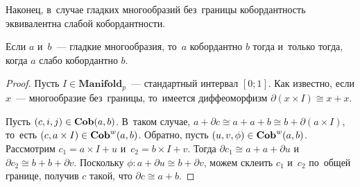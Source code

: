 \documentclass[a4paper,oneside]{article}
\begin{document}
Наконец, в~случае гладких многообразий без~границы кобордантность эквивалентна слабой кобордантности.

\begin{statement*}
    Если $a$ и~$b$~— гладкие многообразия, то~$a$ кобордантно $b$ тогда и~только тогда,
    когда $a$ слабо кобордантно $b$.
\end{statement*}

\begin{proof}
    Пусть $I \in \mathbf{Manifold}_p$~— стандартный интервал $[0; 1]$.
    Как известно, если $x$~— многообразие без~границы,
    то~имеется диффеоморфизм $\partial(x \times I) \cong x + x$.

    Пусть $(c, i, j) \in \mathbf{Cob}(a, b)$. В~таком случае, $a + \partial c \cong a + a + b \cong b + \partial(a \times I)$,
    то~есть $(c, a \times I) \in \mathbf{Cob}^w(a, b)$.
    Обратно, пусть $(u, v, \phi) \in \mathbf{Cob}^w(a, b)$. Рассмотрим $c_1 = a \times I + u$ и~$c_2 = b \times I + v$.
    Тогда $\partial c_1 \cong a + a + \partial u $ и~$\partial c_2 \cong b + b + \partial v$.
    Поскольку $\phi : a + \partial u \cong b + \partial v$, можем склеить $c_1$ и~$c_2$ по~общей
    границе, получив $c$ такой, что $\partial c \cong a + b$.
\end{proof}

\pagebreak
\end{document}
